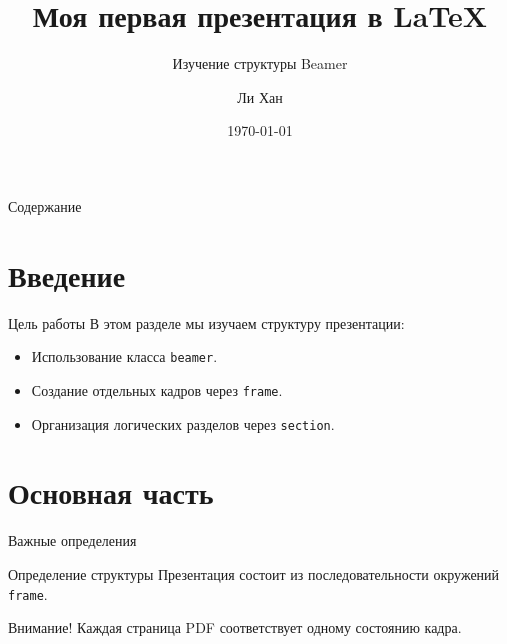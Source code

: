 \documentclass[10pt]{beamer}
\title{Моя первая презентация в LaTeX}
\subtitle{Изучение структуры Beamer}
\author{Ли Хан}
\institute{Российский Университет Дружбы Народов}
\date{\today}
\begin{document}
	
	\begin{frame}
		\titlepage
	\end{frame}
	
	\begin{frame}{Содержание}
		\tableofcontents
	\end{frame}
	
	\section{Введение}
	\begin{frame}{Цель работы}
		В этом разделе мы изучаем структуру презентации:
		\begin{itemize}
			\item Использование класса \texttt{beamer}.
			\item Создание отдельных кадров через \texttt{frame}.
			\item Организация логических разделов через \texttt{section}.
		\end{itemize}
	\end{frame}
	
	\section{Основная часть}
	\begin{frame}{Важные определения}
		\begin{block}{Определение структуры}
			Презентация состоит из последовательности окружений \texttt{frame}.
		\end{block}
		
		\begin{alertblock}{Внимание!}
			Каждая страница PDF соответствует одному состоянию кадра.
		\end{alertblock}
	\end{frame}
	
\end{document}
